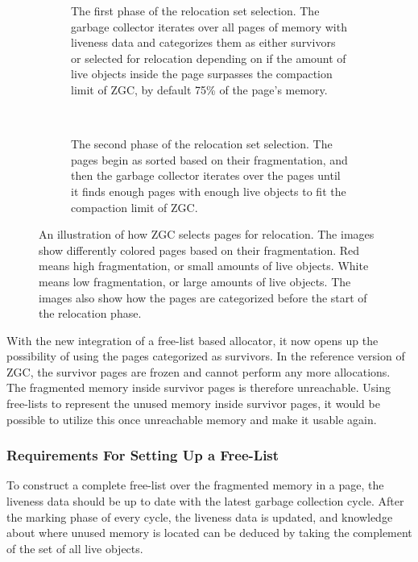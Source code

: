 \begin{figure}[H]
      \centering
      \begin{subfigure}[b]{0.6\textwidth}
                \centering
                
                \caption{The first phase of the relocation set selection. The garbage collector iterates over all pages of memory with liveness data and categorizes them as either survivors or selected for relocation depending on if the amount of live objects inside the page surpasses the compaction limit of ZGC, by default 75\% of the page's memory.}
                \label{fig:rel_set_selector1}
      \end{subfigure}
      \\
      \begin{subfigure}[b]{0.6\textwidth}
                \centering
                
                \caption{The second phase of the relocation set selection. The pages begin as sorted based on their fragmentation, and then the garbage collector iterates over the pages until it finds enough pages with enough live objects to fit the compaction limit of ZGC.}
                \label{fig:rel_set_selector2}
      \end{subfigure}
      \caption{An illustration of how ZGC selects pages for relocation. The images show differently colored pages based on their fragmentation. Red means high fragmentation, or small amounts of live objects. White means low fragmentation, or large amounts of live objects. The images also show how the pages are categorized before the start of the relocation phase.}
      \label{fig:rel_set_selector}
\end{figure} 

With the new integration of a free-list based allocator, it now opens up the possibility of using the pages categorized as survivors. In the reference version of ZGC, the survivor pages are frozen and cannot perform any more allocations. The fragmented memory inside survivor pages is therefore unreachable. Using free-lists to represent the unused memory inside survivor pages, it would be possible to utilize this once unreachable memory and make it usable again.

\subsubsection{Requirements For Setting Up a Free-List}
\label{sec:analyse-init}
To construct a complete free-list over the fragmented memory in a page, the liveness data should be up to date with the latest garbage collection cycle. After the marking phase of every cycle, the liveness data is updated, and knowledge about where unused memory is located can be deduced by taking the complement of the set of all live objects.

